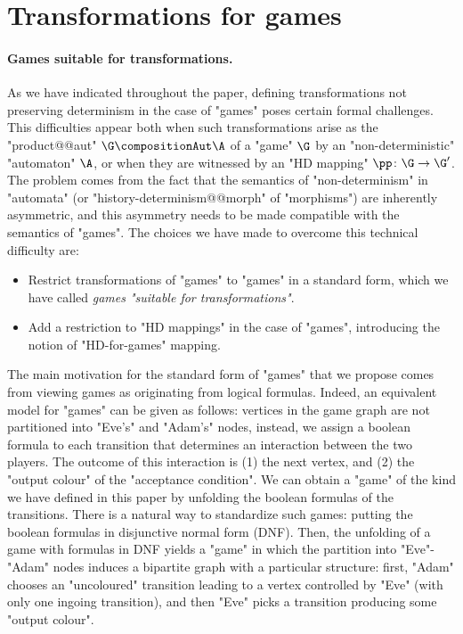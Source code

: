 \documentclass[10pt,a4paper]{amsart}
\begin{document}
 	
	\section{Transformations for games}
	\label{sec:appendix-games-transformations}
	\paragraph*{Games suitable for transformations.}
As we have indicated throughout the paper, defining transformations not preserving determinism in the case of "games" poses certain formal challenges. This difficulties appear both when  such transformations arise as the "product@@aut" $\G \compositionAut \A$ of a "game" $\G$ by an "non-deterministic" "automaton" $\A$, or when they are witnessed by an "HD mapping" $\pp\colon \G \to \G'$. The problem comes from the fact that the semantics of "non-determinism" in "automata" (or "history-determinism@@morph" of "morphisms") are inherently asymmetric,  and this asymmetry needs to be made compatible with the semantics of "games". 
The choices we have made to overcome this technical difficulty are:
\begin{itemize}
	\item Restrict transformations of "games" to "games" in a standard form, which we have called \emph{games "suitable for transformations"}.
	\item Add a restriction to "HD mappings" in the case of "games", introducing the notion of "HD-for-games" mapping. 
\end{itemize}

The main motivation for the standard form of "games" that we propose comes from viewing games as originating from logical formulas. Indeed, an equivalent model for "games" can be given as follows: vertices in the game graph are not partitioned into "Eve's" and "Adam's" nodes, instead, we assign a boolean formula to each transition that determines an interaction between the two players. The outcome of this interaction is (1) the next vertex, and (2) the "output colour" of the "acceptance condition". We can obtain a "game" of the kind we have defined in this paper by unfolding the boolean formulas of the transitions. There is a natural way to standardize such games: putting the boolean formulas in disjunctive normal form (DNF). Then, the unfolding of a game with formulas in DNF yields a "game" in which the partition into "Eve"-"Adam" nodes induces a bipartite graph with a particular structure: first, "Adam" chooses an "uncoloured" transition leading to a vertex controlled by "Eve" (with only one ingoing transition), and then "Eve" picks a transition producing some "output colour".
\end{document}
